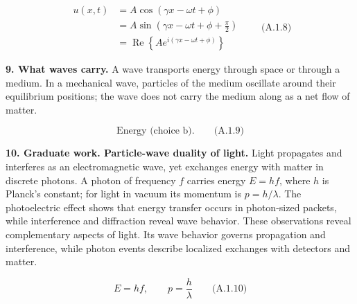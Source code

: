 \[\boxed{\begin{aligned}
u(x,t)&=A\cos(\gamma x-\omega t+\phi)\\
&=A\sin(\gamma x-\omega t+\phi+\tfrac{\pi}{2})\\
&=\operatorname{Re}\!\left\{A e^{i(\gamma x-\omega t+\phi)}\right\}
\end{aligned}}\qquad\text{(A.1.8)}\]

\textbf{9. What waves carry.} A wave transports energy through space or through a medium. In a mechanical wave, particles of the medium oscillate around their equilibrium positions; the wave does not carry the medium along as a net flow of matter.

\[\boxed{\text{Energy (choice b).}}\qquad\text{(A.1.9)}\]

\textbf{10. Graduate work. Particle-wave duality of light.} Light propagates and interferes as an electromagnetic wave, yet exchanges energy with matter in discrete photons. A photon of frequency $f$ carries energy $E=hf$, where $h$ is Planck's constant; for light in vacuum its momentum is $p=h/\lambda$. The photoelectric effect shows that energy transfer occurs in photon-sized packets, while interference and diffraction reveal wave behavior. These observations reveal complementary aspects of light. Its wave behavior governs propagation and interference, while photon events describe localized exchanges with detectors and matter.

\[\boxed{E=hf,\qquad p=\frac{h}{\lambda}}\qquad\text{(A.1.10)}\]
